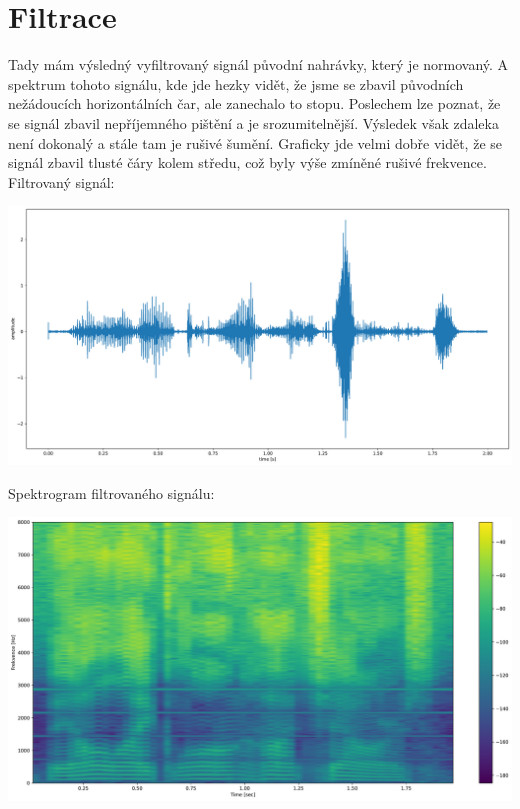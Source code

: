\documentclass[a4paper, 11pt]{article}
\begin{document}
\newpage
\section{Filtrace} 
Tady mám výsledný vyfiltrovaný signál původní nahrávky, který je normovaný. A spektrum tohoto signálu, kde jde hezky vidět, že jsme se zbavil původních nežádoucích horizontálních čar, ale zanechalo to stopu. Poslechem lze poznat, že se signál zbavil nepříjemného pištění a je srozumitelnější. Výsledek však zdaleka není dokonalý a stále tam je rušivé šumění. Graficky jde velmi dobře vidět, že se signál zbavil tlusté čáry kolem středu, což byly výše zmíněné rušivé frekvence.\\

Filtrovaný signál:
\begin{center}
        \includegraphics[scale=0.4]{img/8_filtered.pdf} \\
\end{center} 
Spektrogram filtrovaného signálu:
\begin{center}
        \includegraphics[scale=0.45]{img/7_filtered_spec.pdf} \\
\end{center}
\end{document}
